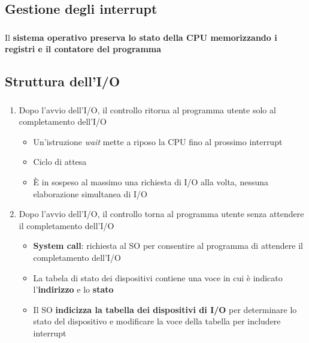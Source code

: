 \documentclass{beamer}
\newenvironment{mainframe}{
	\begin{frame}
		\frametitle{\insertsubsection}
		\framesubtitle{\insertsection}
	}{
	\end{frame}
}
\begin{document}
\subsection{Gestione degli interrupt}
\begin{mainframe}
	Il \textbf{sistema operativo preserva lo stato della CPU memorizzando i registri e il contatore del programma}
\end{mainframe}
\subsection{Struttura dell'I/O}
\begin{mainframe}
	\begin{enumerate}
		\item Dopo l'avvio dell'I/O, il controllo ritorna al programma utente solo al completamento dell'I/O
		\begin{itemize}
			\item Un'istruzione \textit{wait} mette a riposo la CPU fino al prossimo interrupt
			\item Ciclo di attesa
			\item È in sospeso al massimo una richiesta di I/O alla volta, nessuna elaborazione simultanea di I/O
		\end{itemize}
		\item Dopo l'avvio dell'I/O, il controllo torna al programma utente senza attendere il completamento dell'I/O
		\begin{itemize}
			\item \textbf{System call}: richiesta al SO per consentire al programma di attendere il completamento dell'I/O
			\item La tabela di stato dei dispositivi contiene una voce in cui è indicato l'\textbf{indirizzo} e lo \textbf{stato}
			\item Il SO \textbf{indicizza la tabella dei dispositivi di I/O} per determinare lo stato del dispositivo e modificare la voce della tabella per includere interrupt
		\end{itemize}
	\end{enumerate}
\end{mainframe}
\end{document}
